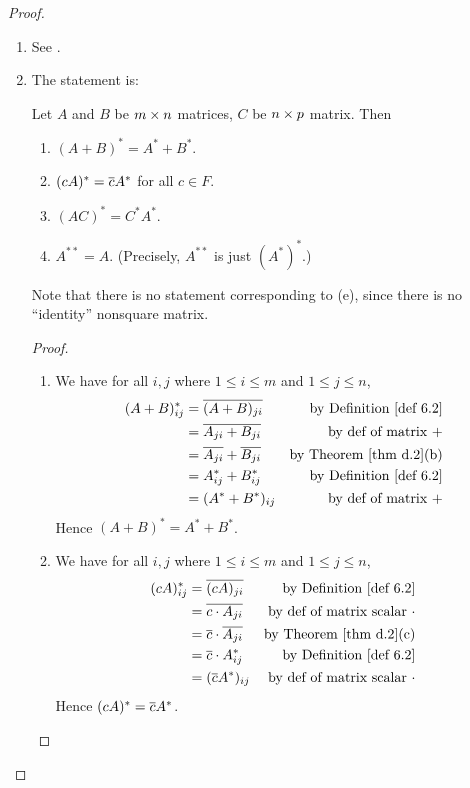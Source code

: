\begin{proof} \ 

\begin{enumerate}
\item See .

\item The statement is:

Let \(A\) and \(B\) be \(m \times n\) matrices, \(C\) be \(n \times p\) matrix.
Then
\begin{enumerate}
\item \((A + B)^* = A^* + B^*\).
\item \((cA)^* = \overline{c}A^*\) for all \(c \in F\).
\item \((AC)^* = C^*A^*\).
\item \(A^{**} = A\).
(Precisely, \(A^{**}\) is just \((A^*)^*\).)
\end{enumerate}
Note that there is no statement corresponding to (e), since there is no ``identity'' nonsquare matrix.
\begin{proof} \

\begin{enumerate}
\item We have for all \(i, j\) where \(1 \le i \le m\) and \(1 \le j \le n\),
\begin{align*}
    (A + B)^*_{ij} & = \conjugatet{(A + B)_{ji}} & \text{by \DEF{6.2}} \\
        & = \conjugatet{A_{ji} + B_{ji}} & \text{by def of matrix \(+\)} \\
        & = \conjugatet{A_{ji}} + \conjugatet{B_{ji}} & \text{by \THM{d.2}(b)} \\
        & = A^*_{ij} + B^*_{ij} & \text{by \DEF{6.2}} \\
        & = (A^* + B^*)_{ij} & \text{by def of matrix \(+\)}
\end{align*}
Hence \((A + B)^* = A^* + B^*\).

\item We have for all \(i, j\) where \(1 \le i \le m\) and \(1 \le j \le n\),
\begin{align*}
    (cA)^*_{ij} & = \conjugatet{(cA)_{ji}} & \text{by \DEF{6.2}} \\
        & = \conjugatet{c \cdot A_{ji}} & \text{by def of matrix scalar \(\cdot\)} \\
        & = \conjugatet{c} \cdot \conjugatet{A_{ji}} & \text{by \THM{d.2}(c)} \\
        & = \conjugatet{c} \cdot A^*_{ij} & \text{by \DEF{6.2}} \\
        & = (\conjugatet{c} A^*)_{ij} & \text{by def of matrix scalar \(\cdot\)}
\end{align*}
Hence \((cA)^* = \overline{c}A^*\).


\end{enumerate}
\end{proof}
\end{enumerate}
\end{proof}
